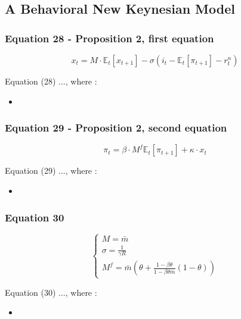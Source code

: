 \documentclass{article}
\begin{document}
\subsection{A Behavioral New Keynesian Model}

\subsubsection*{Equation 28 - Proposition 2, first equation}
\begin{equation}
    x_{t}=M\cdot\mathbb{E}_{t}\left[x_{t+1}\right]-\sigma(i_{t}-\mathbb{E}_{t}\left[\pi_{t+1}\right]-r^{n}_{t})
\end{equation}

Equation (28) ..., where : 
\begin{itemize}
    \item 
\end{itemize}

\subsubsection*{Equation 29 - Proposition 2, second equation}
\begin{equation}
    \pi_{t}=\beta\cdot M^{f} \mathbb{E}_t\left[\pi_{t+1}\right]+\kappa\cdot x_{t}
\end{equation}

Equation (29) ..., where : 
\begin{itemize}
    \item 
\end{itemize}

\subsubsection*{Equation 30}
\begin{equation}
    \begin{cases}
        M=\bar{m} \\
        \sigma=\frac{1}{\gamma R} \\
        M^{f}=\bar{m}\left(\theta+\frac{1-\beta\theta}{1-\beta\theta\bar{m}}(1-\theta)\right)
    \end{cases}
\end{equation}

Equation (30) ..., where : 
\begin{itemize}
    \item 
\end{itemize}
\end{document}
